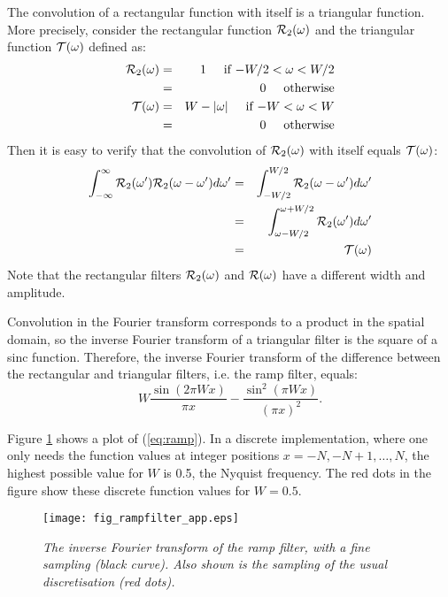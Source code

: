 The convolution of a rectangular function with itself is a triangular
function. More precisely, consider the rectangular function 
${\cal R}_2(\omega)$ and the triangular function ${\cal T}(\omega)$
defined as:
\begin{eqnarray}
 {\cal R}_2(\omega) &=& 1 \hspace{5mm} \mbox{if   $-W/2 < \omega < W/2$}
                        \nonumber \\
                    &=& 0  \hspace{5mm} \mbox{otherwise}\\
 {\cal T}(\omega) &=& W - |\omega| \hspace{5mm} 
             \mbox{if   $-W < \omega < W$} \nonumber\\
                  &=& 0  \hspace{5mm} \mbox{otherwise}
\end{eqnarray}
Then it is easy to verify that the convolution of ${\cal R}_2(\omega)$
with itself equals ${\cal T}(\omega)$:
\begin{eqnarray}
    \int_{-\infty}^\infty {\cal R}_2(\omega') 
                          {\cal R}_2(\omega - \omega') d\omega'
&=& \int_{-W/2}^{W/2} {\cal R}_2(\omega - \omega') d\omega' \nonumber\\
&=& \int_{\omega-W/2}^{\omega+W/2} {\cal R}_2(\omega') d\omega' \nonumber\\
&=& {\cal T}(\omega) 
\end{eqnarray}
Note that the rectangular filters ${\cal R}_2(\omega)$ and ${\cal
R}(\omega)$ have a different width and amplitude.

Convolution in the Fourier transform corresponds to a product in the
spatial domain, so the inverse Fourier transform of a triangular
filter is the square of a sinc function. Therefore, the inverse
Fourier transform of the difference between the rectangular and
triangular filters, i.e. the ramp filter, equals:
\begin{equation}
  W \frac{\sin(2 \pi W x)}{\pi x} - \frac{\sin^2(\pi W x)}{(\pi x)^2}.
  \label{eq:ramp}
\end{equation}

Figure \ref{fig:rampapp} shows a plot of (\ref{eq:ramp}). In a
discrete implementation, where one only needs the function values at
integer positions $x = -N, -N+1, \ldots,N$, the highest possible value
for $W$ is 0.5, the Nyquist frequency. The red dots in the figure show
these discrete function values for $W = 0.5$. 

\begin{figure}[tb]
\centering
\texttt{[image: fig\_rampfilter\_app.eps]}
\caption{\label{fig:rampapp} \emph{The inverse Fourier transform of
    the ramp filter, with a fine sampling (black curve). Also shown is
    the sampling of the usual discretisation (red dots).}}
\end{figure}


